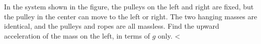         In the system shown in the figure, the pulleys on the
        left and right are fixed, but the pulley in the center can
        move to the left or right. The two hanging masses are identical,
        and the pulleys and ropes are all massless.
        Find the upward acceleration of the mass on the left, in terms
        of $g$ only.
        <%
